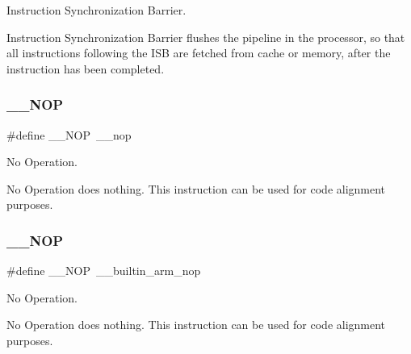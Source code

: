 Instruction Synchronization Barrier. 

Instruction Synchronization Barrier flushes the pipeline in the processor, so that all instructions following the I\+SB are fetched from cache or memory, after the instruction has been completed. \mbox{\label{group___c_m_s_i_s___core___instruction_interface_gabd585ddc865fb9b7f2493af1eee1a572}} 
\subsubsection{\texorpdfstring{\_\_NOP}{\_\_NOP}\hspace{0.1cm}{\footnotesize\ttfamily [1/4]}}
{\footnotesize\ttfamily \#define \+\_\+\+\_\+\+N\+OP~\+\_\+\+\_\+nop}



No Operation. 

No Operation does nothing. This instruction can be used for code alignment purposes. \mbox{\label{group___c_m_s_i_s___core___instruction_interface_gabd585ddc865fb9b7f2493af1eee1a572}} 
\subsubsection{\texorpdfstring{\_\_NOP}{\_\_NOP}\hspace{0.1cm}{\footnotesize\ttfamily [2/4]}}
{\footnotesize\ttfamily \#define \+\_\+\+\_\+\+N\+OP~\+\_\+\+\_\+builtin\+\_\+arm\+\_\+nop}



No Operation. 

No Operation does nothing. This instruction can be used for code alignment purposes. \mbox{\label{group___c_m_s_i_s___core___instruction_interface_gabd585ddc865fb9b7f2493af1eee1a572}} 
